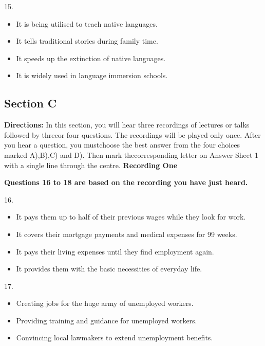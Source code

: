 \documentclass[UTF8,11pt]{ctexart}
\begin{document}
15.


\begin{itemize}[leftmargin=2em,itemsep=.2em,topsep=.4em]\item[A.] It is being utilised to teach native languages.
\item[B.] It tells traditional stories during family time.
\item[C.] It speeds up the extinction of native languages.
\item[D.] It is widely used in language immersion schools.
\end{itemize}

\subsection*{\textbf{Section C}}


\textbf{Directions:} In this section, you will hear three recordings of lectures or talks followed by threeor four questions. The recordings will be played only once. After you hear a question, you mustchoose the best answer from the four choices marked A),B),C) and D). Then mark thecorresponding letter on Answer Sheet 1 with a single line through the centre. \textbf{Recording One}


\textbf{Questions 16 to 18 are based on the recording you have just heard.}


16.


\begin{itemize}[leftmargin=2em,itemsep=.2em,topsep=.4em]\item[A.] It pays them up to half of their previous wages while they look for work.
\item[B.] It covers their mortgage payments and medical expenses for 99 weeks.
\item[C.] It pays their living expenses until they find employment again.
\item[D.] It provides them with the basic necessities of everyday life.
\end{itemize}

17.


\begin{itemize}[leftmargin=2em,itemsep=.2em,topsep=.4em]\item[A.] Creating jobs for the huge army of unemployed workers.
\item[B.] Providing training and guidance for unemployed workers.
\item[C.] Convincing local lawmakers to extend unemployment benefits.
\end{itemize}
\end{document}
